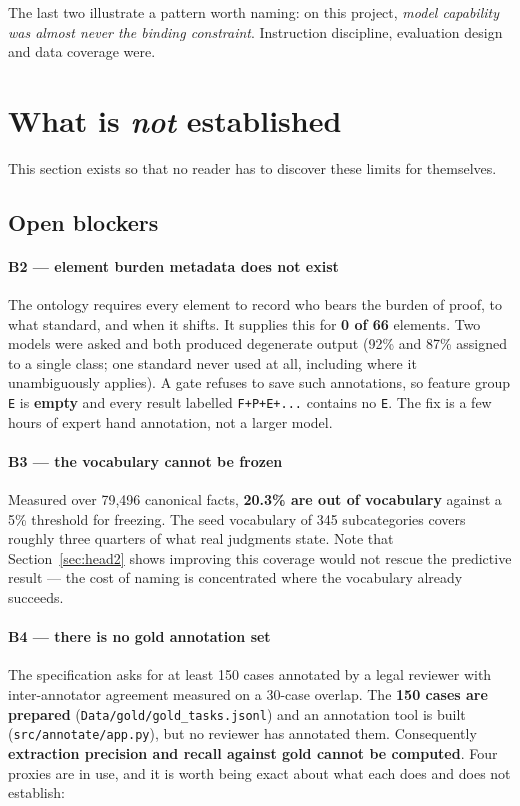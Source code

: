 \documentclass[12pt,a4paper]{article}
\newcommand{\code}[1]{\texttt{\small #1}}
\begin{document}
The last two illustrate a pattern worth naming: on this project, \emph{model capability was almost
never the binding constraint}. Instruction discipline, evaluation design and data coverage were.

\section{What is \emph{not} established}\label{sec:notestablished}

This section exists so that no reader has to discover these limits for themselves.

\subsection{Open blockers}

\paragraph{B2 --- element burden metadata does not exist} The ontology requires every element to
record who bears the burden of proof, to what standard, and when it shifts. It supplies this for
\textbf{0 of 66} elements. Two models were asked and both produced degenerate output (92\% and 87\%
assigned to a single class; one standard never used at all, including where it unambiguously applies).
A gate refuses to save such annotations, so feature group \code{E} is \textbf{empty} and every result
labelled \code{F+P+E+...} contains no \code{E}. The fix is a few hours of expert hand annotation,
not a larger model.

\paragraph{B3 --- the vocabulary cannot be frozen} Measured over 79,496 canonical facts,
\textbf{20.3\% are out of vocabulary} against a 5\% threshold for freezing. The seed vocabulary of
345 subcategories covers roughly three quarters of what real judgments state. Note that
Section~\ref{sec:head2} shows improving this coverage would not rescue the predictive result --- the
cost of naming is concentrated where the vocabulary already succeeds.

\paragraph{B4 --- there is no gold annotation set} The specification asks for at least 150 cases
annotated by a legal reviewer with inter-annotator agreement measured on a 30-case overlap. The
\textbf{150 cases are prepared} (\code{Data/gold/gold\_tasks.jsonl}) and an annotation tool is built
(\code{src/annotate/app.py}), but no reviewer has annotated them. Consequently \textbf{extraction
precision and recall against gold cannot be computed}. Four proxies are in use, and it is worth being
exact about what each does and does not establish:
\end{document}
